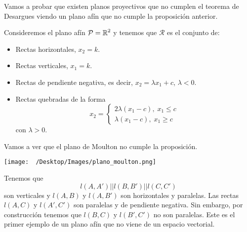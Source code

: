 Vamos a probar que existen planos proyectivos que no cumplen el teorema de Desargues viendo un plano afín que no cumple la proposición anterior. 
\begin{eg}
Consideremos el plano afín $\displaystyle \mathcal{P} = \mathbb{R}^{2} $ y tenemos que $\displaystyle \mathcal{R} $ es el conjunto de:
\begin{itemize}
\item Rectas horizontales, $\displaystyle x_{2} = k $.
\item Rectas verticales, $\displaystyle x_{1} = k $.
\item Rectas de pendiente negativa, es decir, $\displaystyle x_{2} = \lambda x_{1} + c $, $\displaystyle \lambda < 0 $.
\item Rectas quebradas de la forma 
	\[ x_{2} = 
	\begin{cases}
	2\lambda\left(x_{1}-c\right), \; x_{1} \leq c \\
	\lambda\left(x_{1}-c\right), \; x_{1} \geq c
	\end{cases}
	\]
	con $\displaystyle \lambda > 0 $.
\end{itemize}
Vamos a ver que el plano de Moulton no cumple la proposición. 
\begin{center}
	\texttt{[image: ~/Desktop/Images/plano\_moulton.png]}
\end{center}
Tenemos que  
\[ l\left(A,A'\right) | | l\left(B,B'\right) | | l\left(C,C'\right)\]
son verticales y $\displaystyle l\left(A,B\right) $ y $\displaystyle l\left(A,B'\right) $ son horizontales y paralelas. Las rectas $\displaystyle l\left(A,C\right) $ y $l\left(A',C'\right) $ son paralelas y de pendiente negativa. Sin embargo, por construcción tenemos que $\displaystyle l\left(B,C\right) $ y $\displaystyle l\left(B',C'\right) $ no son paralelas. Este es el primer ejemplo de un plano afín que no viene de un espacio vectorial. 
\end{eg}

